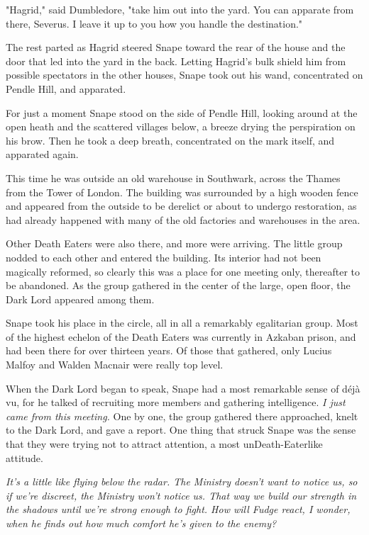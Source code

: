 "Hagrid," said Dumbledore, "take him out into the yard. You can apparate from there, Severus. I leave it up to you how you handle the destination."

The rest parted as Hagrid steered Snape toward the rear of the house and the door that led into the yard in the back. Letting Hagrid's bulk shield him from possible spectators in the other houses, Snape took out his wand, concentrated on Pendle Hill, and apparated.

For just a moment Snape stood on the side of Pendle Hill, looking around at the open heath and the scattered villages below, a breeze drying the perspiration on his brow. Then he took a deep breath, concentrated on the mark itself, and apparated again.

This time he was outside an old warehouse in Southwark, across the Thames from the Tower of London. The building was surrounded by a high wooden fence and appeared from the outside to be derelict or about to undergo restoration, as had already happened with many of the old factories and warehouses in the area.

Other Death Eaters were also there, and more were arriving. The little group nodded to each other and entered the building. Its interior had not been magically reformed, so clearly this was a place for one meeting only, thereafter to be abandoned. As the group gathered in the center of the large, open floor, the Dark Lord appeared among them.

Snape took his place in the circle, all in all a remarkably egalitarian group. Most of the highest echelon of the Death Eaters was currently in Azkaban prison, and had been there for over thirteen years. Of those that gathered, only Lucius Malfoy and Walden Macnair were really top level.

When the Dark Lord began to speak, Snape had a most remarkable sense of déjà vu, for he talked of recruiting more members and gathering intelligence. \emph{I just came from this meeting.} One by one, the group gathered there approached, knelt to the Dark Lord, and gave a report. One thing that struck Snape was the sense that they were trying not to attract attention, a most unDeath-Eaterlike attitude.

\emph{It's a little like flying below the radar. The Ministry doesn't want to notice us, so if we're discreet, the Ministry won't notice us. That way we build our strength in the shadows until we're strong enough to fight. How will Fudge react, I wonder, when he finds out how much comfort he's given to the enemy?}

